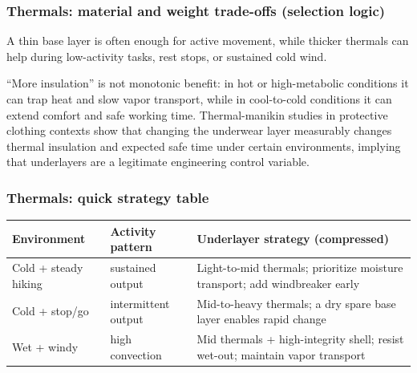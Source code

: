 \begin{frame}[t]
  \frametitle{Thermals: material and weight trade-offs (selection logic)}
  \justifying
  \begin{block}
    A thin base layer is often enough for active movement, while thicker thermals can help during low-activity tasks, rest stops, or sustained cold wind.
  \end{block}

  \begin{block}
    ``More insulation'' is not monotonic benefit: in hot or high-metabolic conditions it can trap heat and slow vapor transport, while in cool-to-cold conditions it can extend comfort and safe working time. Thermal-manikin studies in protective clothing contexts show that changing the underwear layer measurably changes thermal insulation and expected safe time under certain environments, implying that underlayers are a legitimate engineering control variable.~\cite{mlynarczyk_underwear_2025}
  \end{block}
\end{frame}

\begin{frame}[t,shrink=18]
  \frametitle{Thermals: quick strategy table}
  \justifying
  \scriptsize
  \renewcommand{\arraystretch}{0.95}
  \setlength{\tabcolsep}{4pt}
  \begin{table}
    \centering
    \begin{tabularx}{\textwidth}{@{}l l X@{}}
      \toprule
      Environment & Activity pattern & Underlayer strategy (compressed) \\
      \midrule
      Cold + steady hiking & sustained output & Light-to-mid thermals; prioritize moisture transport; add windbreaker early \\
      \addlinespace
      Cold + stop/go & intermittent output & Mid-to-heavy thermals; a dry spare base layer enables rapid change \\
      \addlinespace
      Wet + windy & high convection & Mid thermals + high-integrity shell; resist wet-out; maintain vapor transport \\
      \bottomrule
    \end{tabularx}
  \end{table}
\end{frame}


